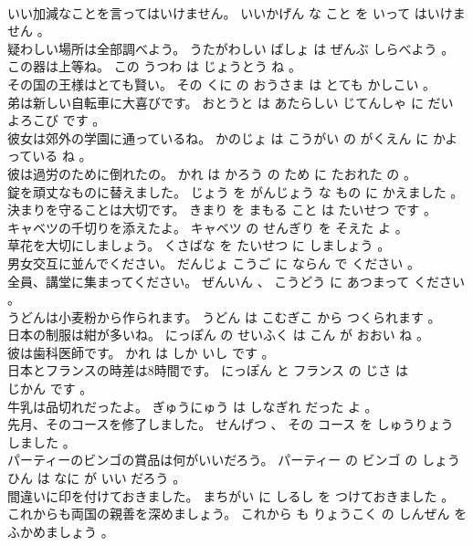 \documentclass[8pt]{extreport}
\begin{document}
\begin{CJK}{UTF8}{min}
\\	いい加減なことを言ってはいけません。	いいかげん な こと を いって はいけません 。 
\\	疑わしい場所は全部調べよう。	うたがわしい ばしょ は ぜんぶ しらべよう 。 
\\	この器は上等ね。	この うつわ は じょうとう ね 。 
\\	その国の王様はとても賢い。	その くに の おうさま は とても かしこい 。 
\\	弟は新しい自転車に大喜びです。	おとうと は あたらしい じてんしゃ に だい よろこび です 。 
\\	彼女は郊外の学園に通っているね。	かのじょ は こうがい の がくえん に かよっている ね 。 
\\	彼は過労のために倒れたの。	かれ は かろう の ため に たおれた の 。 
\\	錠を頑丈なものに替えました。	じょう を がんじょう な もの に かえました 。 
\\	決まりを守ることは大切です。	きまり を まもる こと は たいせつ です 。 
\\	キャベツの千切りを添えたよ。	キャベツ の せんぎり を そえた よ 。 
\\	草花を大切にしましょう。	くさばな を たいせつ に しましょう 。 
\\	男女交互に並んでください。	だんじょ こうご に ならん で ください 。 
\\	全員、講堂に集まってください。	ぜんいん 、 こうどう に あつまって ください 。 
\\	うどんは小麦粉から作られます。	うどん は こむぎこ から つくられます 。 
\\	日本の制服は紺が多いね。	にっぽん の せいふく は こん が おおい ね 。 
\\	彼は歯科医師です。	かれ は しか いし です 。 
\\	日本とフランスの時差は8時間です。	にっぽん と フランス の じさ は 
\\	じかん です 。 
\\	牛乳は品切れだったよ。	ぎゅうにゅう は しなぎれ だった よ 。 
\\	先月、そのコースを修了しました。	せんげつ 、 その コース を しゅうりょう しました 。 
\\	パーティーのビンゴの賞品は何がいいだろう。	パーティー の ビンゴ の しょうひん は なに が いい だろう 。 
\\	間違いに印を付けておきました。	まちがい に しるし を つけておきました 。 
\\	これからも両国の親善を深めましょう。	これから も りょうこく の しんぜん を ふかめましょう 。 

\end{CJK}
\end{document}
